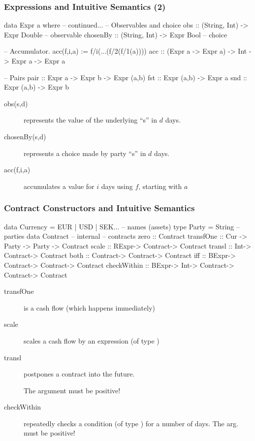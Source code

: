 \documentclass[xcolor=dvipsnames,11pt]{beamer}
\renewcommand{\emph}[1]{\textcolor{structure!90}{#1}}
\begin{document}
\begin{frame}[fragile,t]
    \frametitle{Expressions and Intuitive Semantics (2)}

\begin{hscode}
data Expr a where
    -- continued...
    -- Observables and choice
    obs :: (String, Int) -> Expr Double    -- observable
    chosenBy :: (String, Int) -> Expr Bool -- choice

    -- Accumulator. acc(f,i,a) := f/i(...(f/2(f/1(a))))
    acc :: (Expr a -> Expr a) -> Int -> Expr a -> Expr a

    -- Pairs
    pair :: Expr a -> Expr b -> Expr (a,b)
    fst :: Expr (a,b) -> Expr a
    snd :: Expr (a,b) -> Expr b
\end{hscode}

\begin{description}
\item[obs(s,d)] represents the value of the underlying ``s'' in $d$ days.
\item[chosenBy(s,d)] represents a choice made by party ``s'' in $d$ days.
\item[acc(f,i,a)] accumulates a value for $i$ days using $f$, starting with $a$
\end{description}

\end{frame}

\begin{frame}[fragile,t]
    \frametitle{Contract Constructors and Intuitive Semantics}

\begin{hscode}
  data Currency = EUR | USD | SEK... -- names (assets)
  type Party = String       -- parties
  data Contract -- internal -- contracts
  zero        :: Contract            
  transfOne   :: Cur -> Party -> Party -> Contract
  scale       :: RExpr-> Contract-> Contract
  transl      :: Int-> Contract-> Contract
  both        :: Contract-> Contract-> Contract
  iff         :: BExpr-> Contract-> Contract-> Contract
  checkWithin :: BExpr-> Int-> Contract-> Contract-> Contract
\end{hscode}

\begin{description}
\item[transfOne] is a cash flow (which happens immediately)
\item[scale] scales a cash flow by an expression (of type )
\item[transl] postpones a contract into the \emph{future}.

    The  argument must be positive!

\item[checkWithin] repeatedly checks a condition (of type ) for a number of days.
    The  arg. must be positive!
\end{description}
\end{frame}
\end{document}
